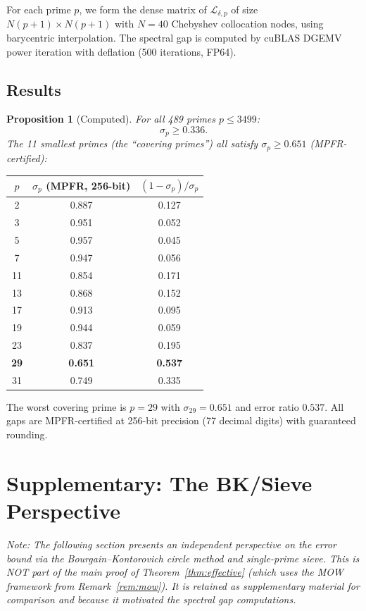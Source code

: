 \documentclass[11pt,a4paper]{amsart}
\newtheorem{proposition}[theorem]{Proposition}
\theoremstyle{definition}
\begin{document}
For each prime $p$, we form the dense matrix of $\mathcal{L}_{\delta,p}$ of size $N(p+1) \times N(p+1)$ with $N=40$ Chebyshev collocation nodes, using barycentric interpolation. The spectral gap is computed by cuBLAS DGEMV power iteration with deflation (500 iterations, FP64).

\subsection{Results}

\begin{proposition}[Computed]\label{prop:gaps}
For all 489 primes $p \leq 3499$:
\[
\sigma_p \geq 0.336.
\]
The 11 smallest primes (the ``covering primes'') all satisfy $\sigma_p \geq 0.651$ (MPFR-certified):
\end{proposition}

\begin{center}
\begin{tabular}{ccc}
\toprule
$p$ & $\sigma_p$ (MPFR, 256-bit) & $(1-\sigma_p)/\sigma_p$ \\
\midrule
2 & 0.887 & 0.127 \\
3 & 0.951 & 0.052 \\
5 & 0.957 & 0.045 \\
7 & 0.947 & 0.056 \\
11 & 0.854 & 0.171 \\
13 & 0.868 & 0.152 \\
17 & 0.913 & 0.095 \\
19 & 0.944 & 0.059 \\
23 & 0.837 & 0.195 \\
\textbf{29} & \textbf{0.651} & \textbf{0.537} \\
31 & 0.749 & 0.335 \\
\bottomrule
\end{tabular}
\end{center}

The worst covering prime is $p=29$ with $\sigma_{29} = 0.651$ and error ratio $0.537$. All gaps are MPFR-certified at 256-bit precision (77 decimal digits) with guaranteed rounding.

\section{Supplementary: The BK/Sieve Perspective}

\emph{Note: The following section presents an independent perspective on the error bound via the Bourgain--Kontorovich circle method and single-prime sieve. This is NOT part of the main proof of Theorem~\ref{thm:effective} (which uses the MOW framework from Remark~\ref{rem:mow}). It is retained as supplementary material for comparison and because it motivated the spectral gap computations.}
\end{document}
